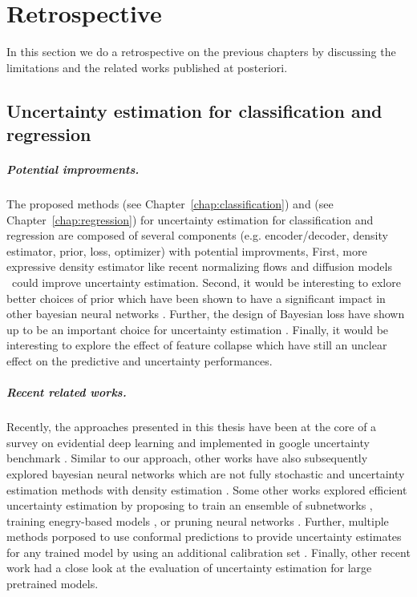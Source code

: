 \chapter{Retrospective}
\label{chap:retrospective}

In this section we do a retrospective on the previous chapters by discussing the limitations and the related works published at posteriori.

\section{Uncertainty estimation for classification and regression} 

\paragraph{Potential improvments.} The proposed methods \PostNetacro{} (see Chapter~\ref{chap:classification}) and \NatPNacro{} (see Chapter~\ref{chap:regression}) for uncertainty estimation for classification and regression are composed of several components (e.g. encoder/decoder, density estimator, prior, loss, optimizer) with potential improvments, First, more expressive density estimator like recent normalizing flows \cite{nf-review} and diffusion models \cite{variationaldiffussion2022kingma} could improve uncertainty estimation. Second, it would be interesting to exlore better choices of prior which have been shown to have a significant impact in other bayesian neural networks \cite{bayesposterior2020wenzel, coldaleatoric2020adlam}. Further, the design of Bayesian loss have shown up to be an important choice for uncertainty estimation \cite{bengs2022pitfalls}. Finally, it would be interesting to explore the effect of feature collapse \cite{due} which have still an unclear effect on the predictive and uncertainty performances.

\paragraph{Recent related works.} Recently, the approaches presented in this thesis have been  at the core of a survey on evidential deep learning \cite{survey_evidential_uncertainty} and implemented in google uncertainty benchmark \cite{nado2021uncertainty}. Similar to our approach, other works have also subsequently explored bayesian neural networks which are not fully stochastic \cite{bnnfullystochastic2022sharma} and uncertainty estimation methods with density estimation \cite{du2022vos, postels2020hiddenuncertainty, sensoy2020uncertainty}. Some other works explored efficient uncertainty estimation by proposing to train an ensemble of subnetworks \cite{mimo-independent-subnetworks}, training enegry-based models \cite{ood_ebm}, or pruning neural networks \cite{ayle2022robustness-sparse}. Further, multiple methods porposed to use conformal predictions to provide uncertainty estimates for any trained model by using an additional calibration set \cite{conformal-survey, Park2020PAC}. Finally, other recent work \cite{tran2022plex} had a close look at the evaluation of uncertainty estimation for large pretrained models.

